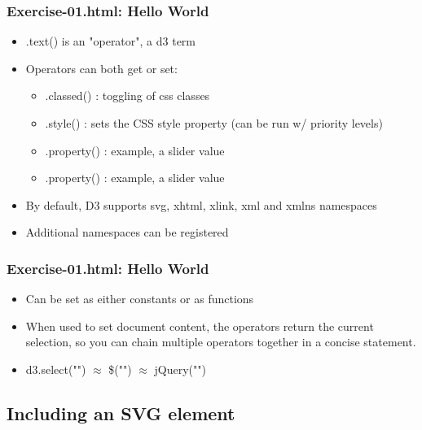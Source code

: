 \documentclass{beamer}
\begin{document}
\begin{frame}
    \frametitle{Exercise-01.html: Hello World}
    \begin{itemize}
    \item .text() is an "operator", a d3 term
    \item Operators can both get or set:
        \begin{itemize}
        \item .classed() : toggling of css classes
        \item .style() : sets the CSS style property (can be run w/ priority levels)
        \item .property() : example, a slider value
        \item .property() : example, a slider value
        \end{itemize}
    \item By default, D3 supports svg, xhtml, xlink, xml and xmlns namespaces
    \item Additional namespaces can be registered
    \end{itemize}
\end{frame}



\begin{frame}
    \frametitle{Exercise-01.html: Hello World}
    \begin{itemize}
    \item Can be set as either constants or as functions
    \item When used to set document content, the operators return the current selection, so you can chain multiple operators together in a concise statement.
    \item d3.select("") $\approx$ \$("") $\approx$ jQuery("")
    \end{itemize}
\end{frame}




\subsection{Including an SVG element}
\end{document}
